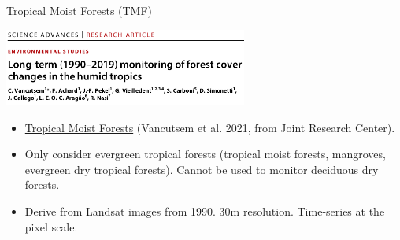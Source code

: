 \documentclass[10pt,table,dvipsnames,compress]{beamer}
\begin{document}
\begin{frame}[label={sec:orga63ded8}]{Tropical Moist Forests (TMF)}
\begin{center}
\includegraphics[width=8cm]{figs/fcc/Vancutsem2021.png}
\end{center}

\begin{itemize}
\item \href{https://forobs.jrc.ec.europa.eu/TMF}{Tropical Moist Forests} (Vancutsem et al. 2021, from Joint Research Center).
\item Only consider evergreen tropical forests (tropical moist forests, mangroves, evergreen dry tropical forests). Cannot be used to monitor deciduous dry forests.
\item Derive from Landsat images from 1990. 30m resolution. Time-series at the pixel scale.
\end{itemize}
\end{frame}
\end{document}
